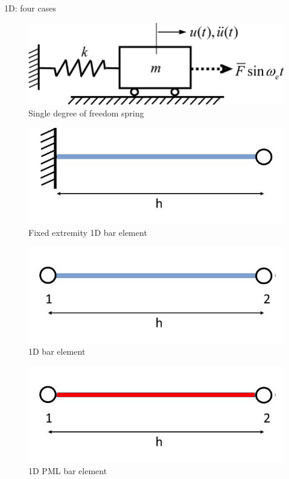 \begin{frame}{1D: four cases}
\begin{figure}[ht] 
  \label{ fig7} 
  \begin{minipage}[b]{0.5\linewidth}
    \centering
    \includegraphics[width=.5\linewidth]{images/sdof-spring.png} \\
    Single degree of freedom spring
    \vspace{4ex}
  \end{minipage}%
  \begin{minipage}[b]{0.5\linewidth}
    \centering
    \includegraphics[width=.5\linewidth]{images/encastred.jpg} \\
    Fixed extremity 1D bar element
    \vspace{4ex}
  \end{minipage} 
  \begin{minipage}[b]{0.5\linewidth}
    \centering
    \includegraphics[width=.5\linewidth]{images/bar-element.jpg} \\
    1D bar element
    \vspace{4ex}
  \end{minipage}%
  \begin{minipage}[b]{0.5\linewidth}
    \centering
    \includegraphics[width=.5\linewidth]{images/bar-element-pml.jpg} \\
    1D PML bar element
    \vspace{4ex}
  \end{minipage} 
\end{figure}
\end{frame}
